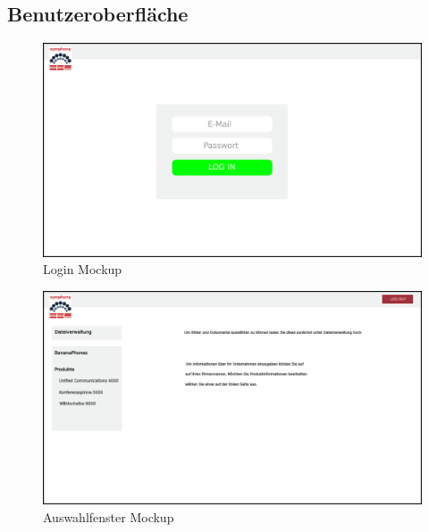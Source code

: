 \documentclass[a4paper,12pt]{article}
\begin{document}
\clearpage

\subsection{Benutzeroberfläche}

\begin{figure}[!htb]
  \centering
     \includegraphics[width=1.0\textwidth]{projmicro_login.png}
  \caption{Login Mockup}
  \label{fig:login}
\end{figure}

\begin{figure}[!htb]
  \centering
     \includegraphics[width=1.0\textwidth]{projmicro_auswahl.png}
  \caption{Auswahlfenster Mockup}
  \label{fig:selection}
\end{figure}
\end{document}

